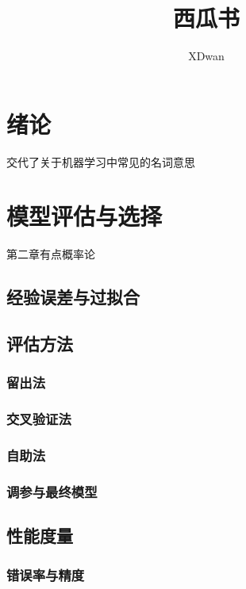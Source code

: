 \documentclass{article}
\title{西瓜书}
\author{XDwan}
\begin{document}
    

\maketitle

\renewcommand{\contentsname}{目录}%
\tableofcontents
\newpage

\section{绪论}

交代了关于机器学习中常见的名词意思

\section{模型评估与选择}

第二章有点概率论

\subsection{经验误差与过拟合}

\subsection{评估方法}

\subsubsection{留出法}

\subsubsection{交叉验证法}

\subsubsection{自助法}

\subsubsection{调参与最终模型}

\subsection{性能度量}

\subsubsection{错误率与精度}
\end{document}
